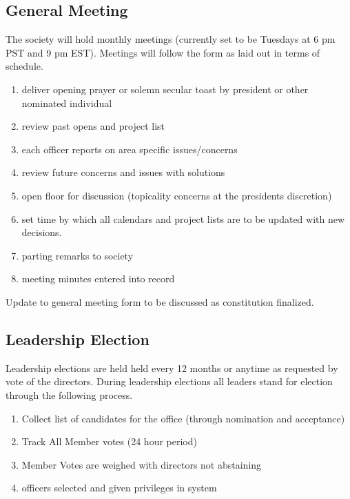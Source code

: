 \documentclass[]{article}
\begin{document}
\subsection{General Meeting}
\label{subsec:general_meet}

The society will hold monthly meetings (currently set to be Tuesdays at 6 pm PST and 9 pm EST). Meetings will follow the form as laid out in terms of schedule. 

\begin{enumerate}
	\item deliver opening prayer or solemn secular toast by president or other nominated individual 
	\item review past opens and project list 
	\item each officer reports on area specific issues/concerns
	\item review future concerns and issues with solutions
	\item open floor for discussion (topicality concerns at the presidents discretion)
	\item set time by which all calendars and project lists are to be updated with new decisions. 
	\item parting remarks to society
	\item meeting minutes entered into record
\end{enumerate}

\vspace{2mm}
\noindent 
Update to general meeting form to be discussed as constitution finalized. 


\subsection{Leadership Election}
\label{sec:leader_meet}


\vspace{2mm}
\noindent 
Leadership elections are held held every 12 months or anytime as requested by vote of the directors. During leadership elections all leaders stand for election through the following process. 

\begin{enumerate}
	\item Collect list of candidates for the office (through nomination and acceptance)
	\item Track All Member votes (24 hour period)
	\item Member Votes are weighed with directors not abstaining 
	\item officers selected and given privileges in system
\end{enumerate}
\end{document}
